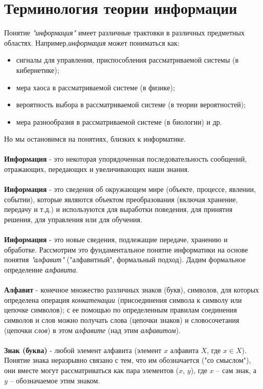 \section{Терминология теории информации}

Понятие \textit{"информация"} имеет различные трактовки в различных предметных областях. Например,\textit{информация} может пониматься как:
\begin{itemize}
\item сигналы для управления, приспособления рассматриваемой системы (в кибернетике);
\item мера хаоса в рассматриваемой системе (в физике);
\item вероятность выбора в рассматриваемой системе (в теории вероятностей);
\item мера разнообразия в рассматриваемой системе (в биологии) и др.
\end{itemize}
 Но мы остановимся на понятиях, близких к информатике.
\\
\\\textbf{Информация} - это некоторая упорядоченная последовательность сообщений, отражающих, передающих и увеличивающих наши знания.
\\
\\\textbf{Информация} - это сведения об окружающем мире (объекте, процессе, явлении, событии), которые являются объектом преобразования (включая хранение, передачу и т.д.) и используются для выработки поведения, для принятия решения, для управления или для обучения.
\\
\\\textbf{Информация} - это новые сведения, подлежащие передаче, хранению и обработке.
\newpage 
Рассмотрим это фундаментальное понятие информатики на основе понятия \textit{"алфавит"} ("алфавитный", формальный подход). Дадим формальное определение \textit{алфавита}.
\\
\\\textbf{Алфавит} - конечное множество различных знаков (букв), символов, для которых определена операция \emph{конкатенации} (присоединения символа к символу или цепочке символов); с ее помощью по определенным правилам соединения символов и слов можно получать слова (цепочки знаков) и словосочетания (цепочки \textit{слов}) в этом \textit{алфавите} (над этим \textit{алфавитом}).
\\
\\\textbf{Знак (буква)} - любой элемент алфавита (элемент $x$ алфавита $X$, где $x \in X$). Понятие знака неразрывно связано с тем, что им обозначается ("со смыслом"), они вместе могут рассматриваться как пара элементов ($x$, $y$), где $x$ – сам знак, а $y$ – обозначаемое этим знаком.\\
